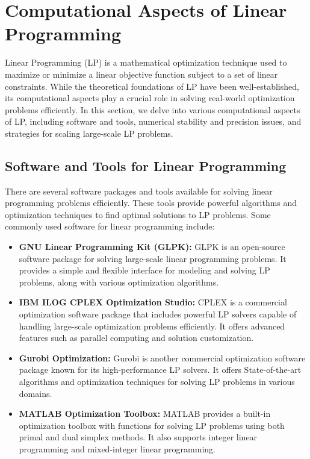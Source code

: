 \documentclass[12pt]{book} %
\begin{document}
\section{Computational Aspects of Linear Programming}

Linear Programming (LP) is a mathematical optimization technique used to maximize or minimize a linear objective function subject to a set of linear constraints. While the theoretical foundations of LP have been well-established, its computational aspects play a crucial role in solving real-world optimization problems efficiently. In this section, we delve into various computational aspects of LP, including software and tools, numerical stability and precision issues, and strategies for scaling large-scale LP problems.

\subsection{Software and Tools for Linear Programming}

There are several software packages and tools available for solving linear programming problems efficiently. These tools provide powerful algorithms and optimization techniques to find optimal solutions to LP problems. Some commonly used software for linear programming include:

\begin{itemize}
    \item \textbf{GNU Linear Programming Kit (GLPK):} GLPK is an open-source software package for solving large-scale linear programming problems. It provides a simple and flexible interface for modeling and solving LP problems, along with various optimization algorithms.
    \item \textbf{IBM ILOG CPLEX Optimization Studio:} CPLEX is a commercial optimization software package that includes powerful LP solvers capable of handling large-scale optimization problems efficiently. It offers advanced features such as parallel computing and solution customization.
    \item \textbf{Gurobi Optimization:} Gurobi is another commercial optimization software package known for its high-performance LP solvers. It offers State-of-the-art algorithms and optimization techniques for solving LP problems in various domains.
    \item \textbf{MATLAB Optimization Toolbox:} MATLAB provides a built-in optimization toolbox with functions for solving LP problems using both primal and dual simplex methods. It also supports integer linear programming and mixed-integer linear programming.
\end{itemize}
\end{document}
